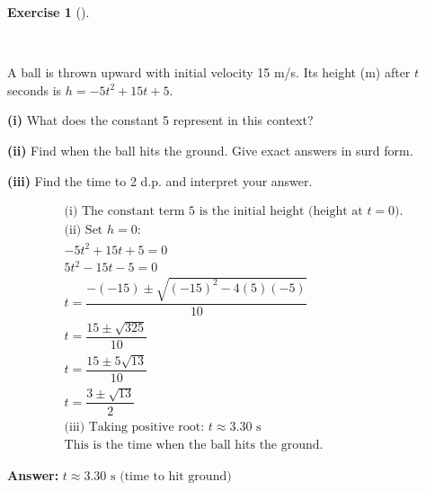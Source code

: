 \documentclass[
  letterpaper,
  DIV=11,
  numbers=noendperiod]{scrreprt}
\theoremstyle{definition}
\newtheorem{exercise}{Exercise}[chapter]
\theoremstyle{remark}
\begin{document}
\begin{exercise}[]\protect\hypertarget{exr-u6-20-2}{}\label{exr-u6-20-2}

~

A ball is thrown upward with initial velocity 15 m/s. Its height (m)
after \(t\) seconds is \(h = -5t^2 + 15t + 5\).

\textbf{(i)} What does the constant 5 represent in this context?

\textbf{(ii)} Find when the ball hits the ground. Give exact answers in
surd form.

\textbf{(iii)} Find the time to 2 d.p. and interpret your answer.

\begin{tcolorbox}[enhanced jigsaw, opacitybacktitle=0.6, coltitle=black, arc=.35mm, colframe=quarto-callout-tip-color-frame, colback=white, bottomrule=.15mm, left=2mm, colbacktitle=quarto-callout-tip-color!10!white, titlerule=0mm, opacityback=0, title=\textcolor{quarto-callout-tip-color}{\faLightbulb}\hspace{0.5em}{🔍 View Solution}, leftrule=.75mm, breakable, rightrule=.15mm, bottomtitle=1mm, toptitle=1mm, toprule=.15mm]

\begin{align*}
\text{(i) The constant term 5 is the initial height (height at } t=0\text{).} \\ \text{(ii) Set } h=0: \\ -5t^2 + 15t + 5 = 0 \\ 5t^2 - 15t - 5 = 0 \\ t = \dfrac{-(-15) \pm \sqrt{(-15)^2 - 4(5)(-5)}}{10} \\ t = \dfrac{15 \pm \sqrt{325}}{10} \\ t = \dfrac{15 \pm 5\sqrt{13}}{10} \\ t = \dfrac{3 \pm \sqrt{13}}{2} \\ \text{(iii) Taking positive root: } t \approx 3.30 \text{ s} \\ \text{This is the time when the ball hits the ground.}
\end{align*}

\textbf{Answer:} \(t \approx 3.30 \text{ s (time to hit ground)}\)

\end{tcolorbox}

\end{exercise}
\end{document}
